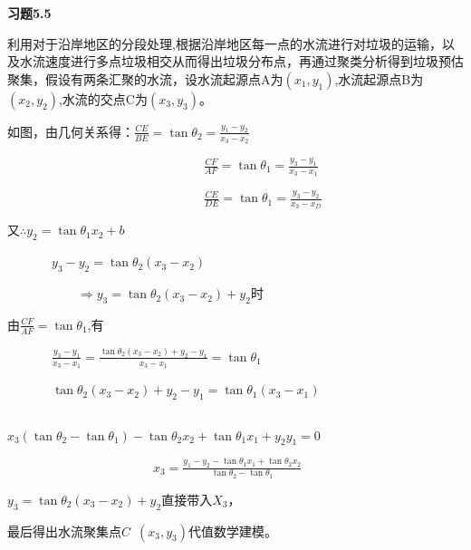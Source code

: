 \documentclass[12pt]{ctexart}  %
\newcommand{\sanhao}{\fontsize{15.75pt}{\baselineskip}\selectfont}
\begin{document}
\thispagestyle{empty}  %



\begin{center}
{\sanhao\bf 习题5.5}
\end{center}

利用对于沿岸地区的分段处理,根据沿岸地区每一点的水流进行对垃圾的运输，以及水流速度进行多点垃圾相交从而得出垃圾分布点，再通过聚类分析得到垃圾预估聚集，假设有两条汇聚的水流，设水流起源点A为$(x_1,y_1)$,水流起源点B为$(x_2,y_2)$,水流的交点C为$(x_3,y_3)$。

如图，由几何关系得：$\frac{CE}{BE}=\tan {\theta_2}=\frac {y_1-y_2}{x_3-x_2}$

~~~~~~~~~~~~~~~~~~~~~~~~~~~~~~~$\frac{CF}{AF}=\tan {\theta_1}=\frac {y_3-y_1}{x_3-x_1}$

~~~~~~~~~~~~~~~~~~~~~~~~~~~~~~~$\frac{CE}{DE}=\tan {\theta_1}=\frac {y_3-y_2}{x_3-x_D}$

又$\therefore y_2=\tan {\theta_1 x_2}+b$

~~~~~~~$y_3-y_2=\tan {\theta_2}(x_3-x_2)$

~~~~~~~~~~~$\Rightarrow y_3=\tan {\theta_2}(x_3-x_2)+y_2$时

由$\frac{CF}{AF}=\tan {\theta_1}$,有

~~~~~~~$\frac {y_3-y_1}{x_3-x_1}=\frac{\tan {\theta_2}(x_3-x_2)+y_2-y_1}{x_3-x_1}=\tan {\theta_1}$

~~~~~~~$\tan {\theta_2}(x_3-x_2)+y_2-y_1=\tan {\theta_1}(x_3-x_1)$

~~~~~~~~~~~~~~~~~~~~~~~$x_3(\tan {\theta_2}-\tan {\theta_1})-\tan {\theta_2}x_2+\tan {\theta_1}x_1+y_2y_1=0$

~~~~~~~~~~~~~~~~~~~~~~~$x_3=\frac{y_1-y_2-\tan {\theta_1}x_1+\tan {\theta_2}x_2}{\tan {\theta_2}-\tan {\theta_1}}$

$y_3=\tan {\theta_2}(x_3-x_2)+y_2$直接带入$X_3$，

最后得出水流聚集点$C $~$(x_3,y_3)$代值数学建模。
\end{document}
